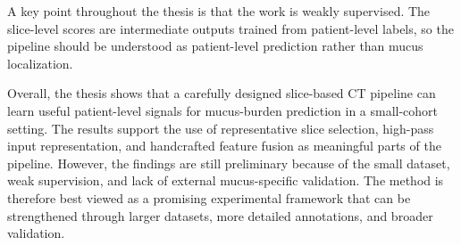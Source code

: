 A key point throughout the thesis is that the work is weakly supervised. The slice-level scores are intermediate outputs trained from patient-level labels, so the pipeline should be understood as patient-level prediction rather than mucus localization.

Overall, the thesis shows that a carefully designed slice-based CT pipeline can learn useful patient-level signals for mucus-burden prediction in a small-cohort setting. The results support the use of representative slice selection, high-pass input representation, and handcrafted feature fusion as meaningful parts of the pipeline. However, the findings are still preliminary because of the small dataset, weak supervision, and lack of external mucus-specific validation. The method is therefore best viewed as a promising experimental framework that can be strengthened through larger datasets, more detailed annotations, and broader validation.
